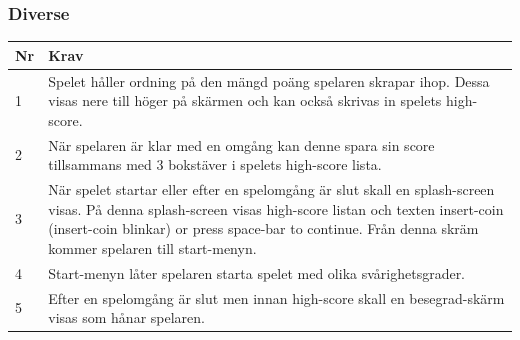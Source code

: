 \documentclass{TDP003mall}
\begin{document}
\subsubsection{Diverse}
\begin{table}[!h]
\begin{tabularx}{\linewidth}{|l|X|}
\hline
Nr & Krav\\\hline
1 & Spelet håller ordning på den mängd poäng spelaren skrapar ihop. Dessa visas nere till höger på skärmen och kan också skrivas in spelets high-score.\\\hline
2 & När spelaren är klar med en omgång kan denne spara sin score tillsammans med 3 bokstäver i spelets high-score lista.\\\hline
3 & När spelet startar eller efter en spelomgång är slut skall en splash-screen visas. På denna splash-screen visas high-score listan och texten insert-coin (insert-coin blinkar) or press space-bar to continue. Från denna skräm kommer spelaren till start-menyn.\\\hline
4 & Start-menyn låter spelaren starta spelet med olika svårighetsgrader.\\\hline
5 & Efter en spelomgång är slut men innan high-score skall en besegrad-skärm visas som hånar spelaren.\\\hline
\end{tabularx}
\end{table}

 \newpage
 
\end{document}

